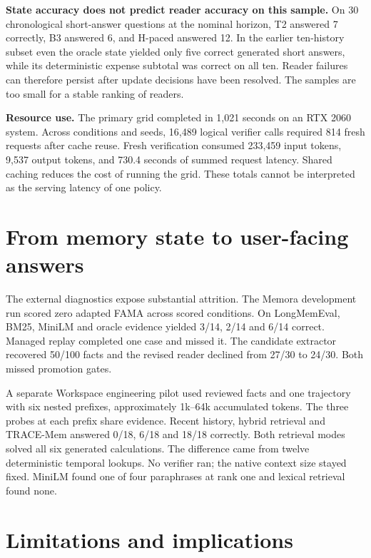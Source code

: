 \documentclass[
  11pt,
]{article}
\newcounter{none} %
\begin{document}
\textbf{State accuracy does not predict reader accuracy on this sample.}
On 30 chronological short-answer questions at the nominal horizon, T2
answered 7 correctly, B3 answered 6, and H-paced answered 12. In the
earlier ten-history subset even the oracle state yielded only five
correct generated short answers, while its deterministic expense
subtotal was correct on all ten. Reader failures can therefore persist
after update decisions have been resolved. The samples are too small for
a stable ranking of readers.

\textbf{Resource use.} The primary grid completed in 1,021 seconds on an
RTX 2060 system. Across conditions and seeds, 16,489 logical verifier
calls required 814 fresh requests after cache reuse. Fresh verification
consumed 233,459 input tokens, 9,537 output tokens, and 730.4 seconds of
summed request latency. Shared caching reduces the cost of running the
grid. These totals cannot be interpreted as the serving latency of one
policy.

\section{From memory state to user-facing
answers}\label{from-memory-state-to-user-facing-answers}

The external diagnostics expose substantial attrition. The Memora
development run scored zero adapted FAMA across scored conditions. On
LongMemEval, BM25, MiniLM and oracle evidence yielded 3/14, 2/14 and
6/14 correct. Managed replay completed one case and missed it. The
candidate extractor recovered 50/100 facts and the revised reader
declined from 27/30 to 24/30. Both missed promotion gates.

A separate Workspace engineering pilot used reviewed facts and one
trajectory with six nested prefixes, approximately 1k--64k accumulated
tokens. The three probes at each prefix share evidence. Recent history,
hybrid retrieval and TRACE-Mem answered 0/18, 6/18 and 18/18 correctly.
Both retrieval modes solved all six generated calculations. The
difference came from twelve deterministic temporal lookups. No verifier
ran; the native context size stayed fixed. MiniLM found one of four
paraphrases at rank one and lexical retrieval found none.

\section{Limitations and
implications}\label{limitations-and-implications}
\end{document}
